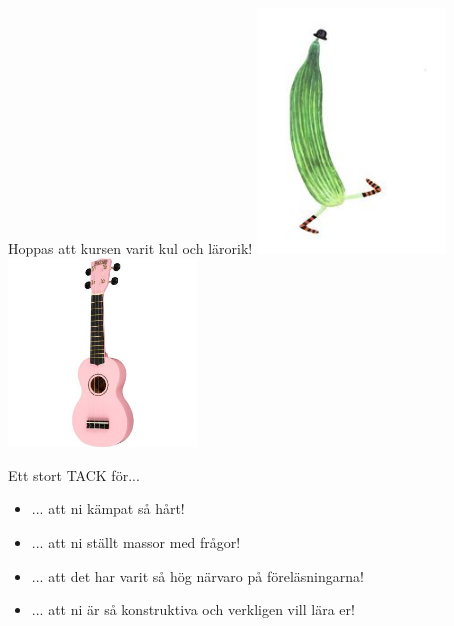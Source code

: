 \begin{Slide}{Hoppas att kursen varit kul och lärorik!}
\includegraphics[width=5cm]{../img/gurka.jpg}\includegraphics[width=5cm]{../img/ukulele.jpg}
\end{Slide}

\begin{Slide}{Ett stort TACK för...}
\begin{itemize}
\item ... att ni kämpat så hårt!
\item ... att ni ställt massor med frågor!
\item ... att det har varit så hög närvaro på föreläsningarna!
\item ... att ni är så konstruktiva och verkligen vill lära er!
\end{itemize}
\vspace{2em} \pause

\end{Slide}


\fi